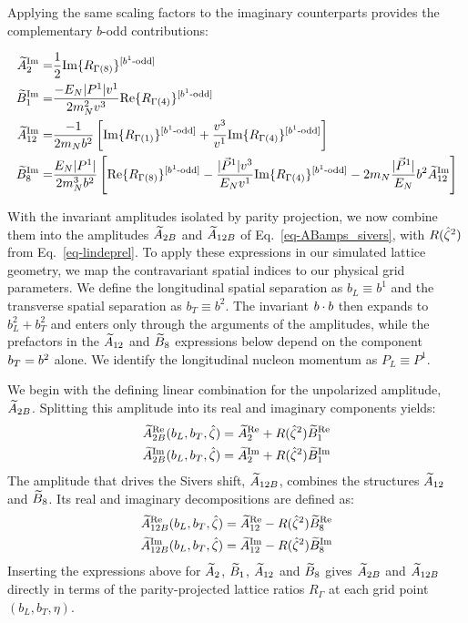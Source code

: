 Applying the same scaling factors to the imaginary counterparts provides the complementary $b$-odd contributions:
\begin{widetext}
\begin{align}
    \widetilde{A}^{\text{Im}}_2 = & \frac{1}{2}\text{Im}\{ R_{\Gamma(8)}\}^{[b^{1}\text{-odd}]} \\
    \widetilde{B}^{\text{Im}}_1 = & \frac{-E_{N}|P^1|v^1}{2m_N^2 v^3} \text{Re}\{ R_{\Gamma(4)}\}^{[b^{1}\text{-odd}]}\\
    \widetilde{A}^{\text{Im}}_{12}=&\frac{-1}{2m_N  b^2}\left[\text{Im}\{ R_{\Gamma(1)}\}^{[b^{1}\text{-odd}]}+\frac{v^3}{v^1}\text{Im}\{ R_{\Gamma(4)}\}^{[b^{1}\text{-odd}]}\right]\\
    \widetilde{B}^{\text{Im}}_8=&\frac{E_N|P^1|}{ 2m_N^3 b^2  }\left[\text{Re}\{ R_{\Gamma(8)}\}^{[b^{1}\text{-odd}]}-\frac{|\vec{P}^1|v^3}{E_N v^1}\text{Im}\{ R_{\Gamma(4)}\}^{[b^{1}\text{-odd}]}- 2m_N  \frac{|\vec{P}^1|}{E_N} b^2  \widetilde{A}^{\text{Im}}_{12}\right]
\end{align}
\end{widetext}



With the invariant amplitudes isolated by parity projection, we now combine them into the amplitudes $\widetilde{A}_{2B}$ and $\widetilde{A}_{12B}$ of Eq.~\eqref{eq-ABamps_sivers}, with $R({\hat \zeta}^2)$ from Eq.~\eqref{eq-lindeprel}. 
To apply these expressions in our simulated lattice geometry, we map the contravariant spatial indices to our physical grid parameters. We define the longitudinal spatial separation as $b_L \equiv b^1$ and the transverse spatial separation as $b_T \equiv b^2$.
The invariant $b\cdot b$ then expands to $b_L^2 + b_T^2$ and enters only through the arguments of the amplitudes, while the prefactors in the $\widetilde{A}_{12}$ and $\widetilde{B}_8$ expressions below depend on the component $b_T=b^2$ alone. We identify the longitudinal nucleon momentum as $P_L \equiv P^1$. 

We begin with the defining linear combination for the unpolarized amplitude, $\widetilde{A}_{2B}$. Splitting this amplitude into its real and imaginary components yields:
\begin{align}
    \widetilde{A}_{2B}^{\text{Re}}(b_L, b_T, \hat{\zeta}) &= \widetilde{A}_2^{\text{Re}} + R({\hat \zeta}^2) \widetilde{B}_1^{\text{Re}} \\
    \widetilde{A}_{2B}^{\text{Im}}(b_L, b_T, \hat{\zeta}) &= \widetilde{A}_2^{\text{Im}} + R({\hat \zeta}^2) \widetilde{B}_1^{\text{Im}}
\end{align}
The amplitude that drives the Sivers shift, $\widetilde{A}_{12B}$, combines the structures $\widetilde{A}_{12}$ and $\widetilde{B}_8$. Its real and imaginary decompositions are defined as:
\begin{align}
    \widetilde{A}_{12B}^{\text{Re}}(b_L, b_T, \hat{\zeta}) &= \widetilde{A}_{12}^{\text{Re}} - R({\hat \zeta}^2) \widetilde{B}_8^{\text{Re}} \\
    \widetilde{A}_{12B}^{\text{Im}}(b_L, b_T, \hat{\zeta}) &= \widetilde{A}_{12}^{\text{Im}} - R({\hat \zeta}^2) \widetilde{B}_8^{\text{Im}}
\end{align}
Inserting the expressions above for $\widetilde{A}_2$, $\widetilde{B}_1$, $\widetilde{A}_{12}$ and $\widetilde{B}_8$ gives $\widetilde{A}_{2B}$ and $\widetilde{A}_{12B}$ directly in terms of the parity-projected lattice ratios $R_{\Gamma}$ at each grid point $(b_L,b_T,\eta)$.

